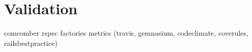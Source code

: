 \section{Validation}
comcomber
rspec
factories
metrics (travis, gemnasium, codeclimate, coverules, railsbestpractice)